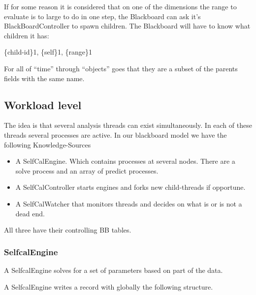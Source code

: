\documentclass[]{lofar}
\begin{document}
      If for some reason it is considered that on one of the
      dimensions the range to evaluate is to large to do in one step,
      the Blackboard can ask it's BlackBoardController to spawn
      children. The Blackboard will have to know what children it has:

      \{child-id\}1, \{self\}1, \{range\}1

      For all of ``time'' through ``objects'' goes that they are a subset
      of the parents fields with the same name.

    \subsection{Workload level}
    \label{subsec:workload-level}\hypertarget{subsec:workload-level}{}%

      The idea is that several analysis threads can exist
      simultaneously. In each of these threads several processes are
      active. In our blackboard model we have the following
      Knowledge-Sources

      \begin{itemize}

	\item 

          A SelfCalEngine. Which contains processes at several
          nodes. There are a solve process and an array of predict
          processes.

	\item 

          A SelfCalController starts engines and forks new
          child-threads if opportune.

	\item 

          A SelfCalWatcher that monitors threads and decides on what
          is or is not a dead end.

      \end{itemize}

      All three have their controlling BB tables.

      \subsubsection{SelfcalEngine}
      \label{subsubsec:SelfcalEngine}\hypertarget{subsubsec:SelfcalEngine}{}

        A SelfcalEngine solves for a set of parameters based on part
        of the data.

        A SelfcalEngine writes a record with globally the following
        structure.
\end{document}
